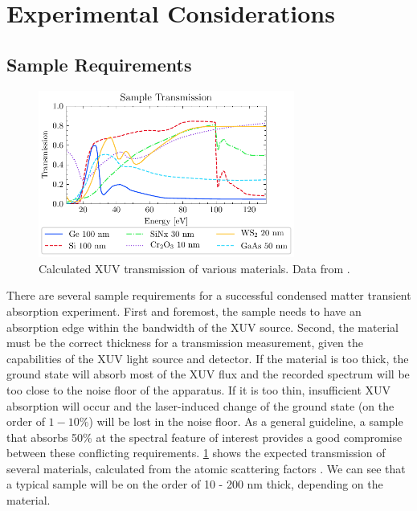 \section{Experimental Considerations}

\subsection{Sample Requirements}

\begin{figure}
	\centering
	\includegraphics[width=0.75\textwidth]{figures/chap4/Sample_transmission_CXRO.pdf}
	\caption{Calculated XUV transmission of various materials. Data from \cite{gulliksonCXROXRayInteractions}.}
	\label{fig:Sample_trans_CXRO}
\end{figure}

There are several sample requirements for a successful condensed matter transient absorption experiment. First and foremost, the sample needs to have an absorption edge within the bandwidth of the XUV source. Second, the material must be the correct thickness for a transmission measurement, given the capabilities of the XUV light source and detector. If the material is too thick, the ground state will absorb most of the XUV flux and the recorded spectrum will be too close to the noise floor of the apparatus. If it is too thin, insufficient XUV absorption will occur and the laser-induced change of the ground state (on the order of $1-10\%$) will be lost in the noise floor. As a general guideline, a sample that absorbs 50\% at the spectral feature of interest provides a good compromise between these conflicting requirements. \cref{fig:Sample_trans_CXRO} shows the expected transmission of several materials, calculated from the atomic scattering factors \cite{gulliksonCXROXRayInteractions}. We can see that a typical sample will be on the order of 10 - 200 nm thick, depending on the material.

